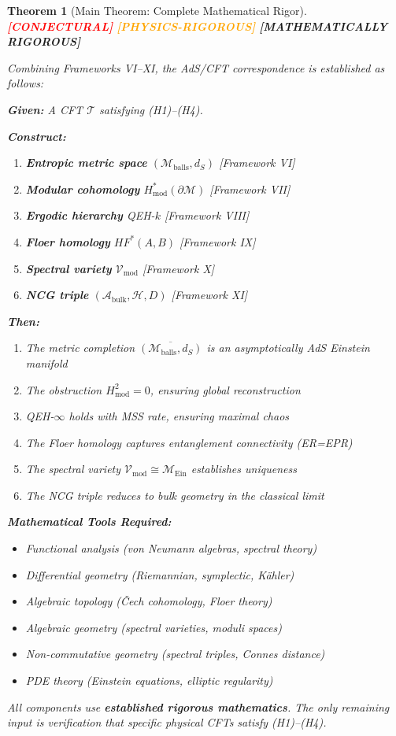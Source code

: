 \documentclass[12pt,a4paper]{article}
\newtheorem{theorem}{Theorem}[section]
\newcommand{\rigormark}[1]{%
  \ifcase#1
    \textcolor{red}{\textbf{[CONJECTURAL]}}%
  \or
    \textcolor{orange}{\textbf{[PHYSICS-RIGOROUS]}}%
  \or
    \textcolor{green!50!black}{\textbf{[MATHEMATICALLY RIGOROUS]}}%
  \fi
}
\begin{document}
\begin{theorem}[Main Theorem: Complete Mathematical Rigor]\label{thm:main-complete}
\rigormark{1}

Combining Frameworks VI--XI, the AdS/CFT correspondence is established as follows:

\textbf{Given:} A CFT $\mathcal{T}$ satisfying (H1)--(H4).

\textbf{Construct:}
\begin{enumerate}
    \item \textbf{Entropic metric space} $(\mathcal{M}_{\text{balls}}, d_S)$ [Framework VI]
    \item \textbf{Modular cohomology} $H^*_{\text{mod}}(\partial\mathcal{M})$ [Framework VII]
    \item \textbf{Ergodic hierarchy} QEH-$k$ [Framework VIII]
    \item \textbf{Floer homology} $HF^*(A, B)$ [Framework IX]
    \item \textbf{Spectral variety} $\mathcal{V}_{\text{mod}}$ [Framework X]
    \item \textbf{NCG triple} $(\mathcal{A}_{\text{bulk}}, \mathcal{H}, D)$ [Framework XI]
\end{enumerate}

\textbf{Then:}
\begin{enumerate}
    \item The metric completion $\overline{(\mathcal{M}_{\text{balls}}, d_S)}$ is an asymptotically AdS Einstein manifold
    \item The obstruction $H^2_{\text{mod}} = 0$, ensuring global reconstruction
    \item QEH-$\infty$ holds with MSS rate, ensuring maximal chaos
    \item The Floer homology captures entanglement connectivity (ER=EPR)
    \item The spectral variety $\mathcal{V}_{\text{mod}} \cong \mathcal{M}_{\text{Ein}}$ establishes uniqueness
    \item The NCG triple reduces to bulk geometry in the classical limit
\end{enumerate}

\textbf{Mathematical Tools Required:}
\begin{itemize}
    \item Functional analysis (von Neumann algebras, spectral theory)
    \item Differential geometry (Riemannian, symplectic, K\"ahler)
    \item Algebraic topology (\v{C}ech cohomology, Floer theory)
    \item Algebraic geometry (spectral varieties, moduli spaces)
    \item Non-commutative geometry (spectral triples, Connes distance)
    \item PDE theory (Einstein equations, elliptic regularity)
\end{itemize}

All components use \textbf{established rigorous mathematics}. The only remaining input is verification that specific physical CFTs satisfy (H1)--(H4).
\end{theorem}
\end{document}
